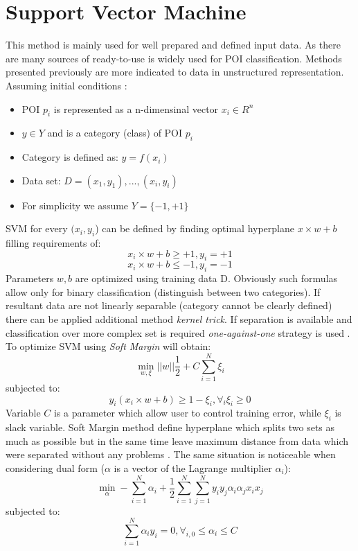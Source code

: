 \section{Support Vector Machine}
This method is mainly used for well prepared and defined input data. As there are many sources of ready-to-use is widely used for POI classification. Methods presented previously are more indicated to data in unstructured representation. Assuming initial conditions \cite{6}:
\begin{itemize}
	\item POI $p_i$ is represented as a n-dimensinal vector $x_i \in R^n$
	\item $y \in Y$ and is a category (class) of POI $p_i$
	\item Category is defined as: $y=f(x_i)$
	\item Data set: $D={(x_1,y_1),...,(x_i,y_i)}$
	\item For simplicity we assume $Y=\{-1,+1\}$
\end{itemize}
SVM for every $(x_i,y_i$) can be defined by finding optimal hyperplane $x \times w + b$ filling requirements of:
\begin{equation}
x_i \times w + b \geq +1, y_i= +1
\end{equation}
\begin{equation}
x_i \times w + b \leq -1, y_i= -1
\end{equation}
Parameters $w,b$ are optimized using training data D. Obviously such formulas allow only for binary classification (distinguish between two categories). If resultant data are not linearly separable (category cannot be clearly defined) there can be applied additional method \textit{kernel trick}. If separation is available and classification over more complex set is required \textit{one-against-one} strategy is used \cite{7}. To optimize SVM using \textit{Soft Margin} will obtain:
\begin{equation}
\min_{w,\xi} ||w||\frac{1}{2} + C\sum_{i=1}^{N}\xi_i
\end{equation}
subjected to:
\begin{equation}
y_i (x_i \times w + b) \geq 1 - \xi_i,  \forall_i \xi_i \geq 0
\end{equation}
Variable $C$ is a parameter which allow user to control training error, while $\xi_i$ is slack variable. Soft Margin method define hyperplane which splits two sets as much as possible but in the same time leave maximum distance from data which were separated without any problems \cite{7}.
The same situation is noticeable when considering dual form ($\alpha$ is a vector of the Lagrange multiplier $\alpha_i$):
\begin{equation}
\min_\alpha - \sum_{i=1}^{N}\alpha_i + \frac{1}{2}\sum_{i=1}^{N}\sum_{j=1}^{N}y_iy_j\alpha_i\alpha_jx_ix_j
\end{equation}
subjected to:
\begin{equation}
\sum_{i=1}^{N}\alpha_iy_i=0, \forall_{i,0} \leq \alpha_i \leq C
\end{equation}
